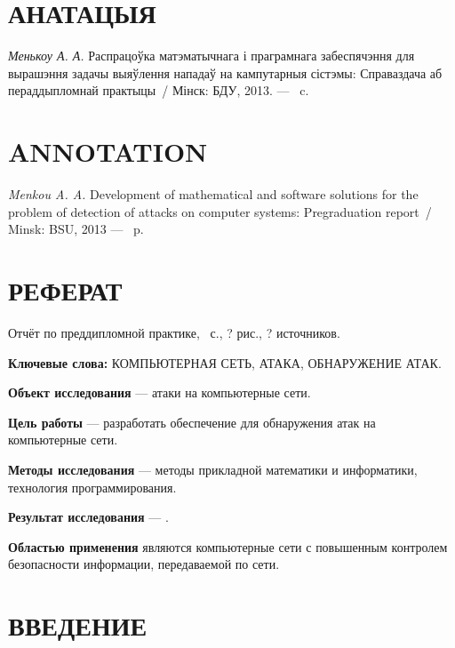 \medskip


\section*{АНАТАЦЫЯ}

\textit{Менькоу А. А.} Распрацоўка матэматычнага і праграмнага забеспячэння для вырашэння задачы выяўлення нападаў на кампутарныя сістэмы: Справаздача аб пераддыпломнай практыцы~/ Мінск: 
БДУ, 2013. --- \pagescount~c.

\medskip


\section*{ANNOTATION}

\textit{Menkou A. A.} Development of mathematical and software solutions for the problem of detection of attacks on computer systems:
Pregraduation report~/ Minsk: BSU, 2013 --- \pagescount~p.

\medskip

\newpage

\section*{РЕФЕРАТ}

Отчёт по преддипломной практике, \pagescount\ с., ? рис., 
? источников. 

\medskip
\textbf{Ключевые слова:} КОМПЬЮТЕРНАЯ СЕТЬ, АТАКА, ОБНАРУЖЕНИЕ АТАК.

\medskip
\textbf{Объект исследования} --- атаки на компьютерные сети.

\textbf{Цель работы} --- разработать обеспечение для обнаружения атак на компьютерные сети.

\textbf{Методы исследования} --- методы прикладной математики и информатики, 
технология программирования.

\textbf{Результат исследования} --- .

\textbf{Областью применения} являются компьютерные сети с повышенным контролем безопасности информации, передаваемой по сети.

\newpage

\renewcommand{\contentsname}{СОДЕРЖАНИЕ}
\tableofcontents

\newpage
\listoffigures
\newpage

\section*{ВВЕДЕНИЕ}

